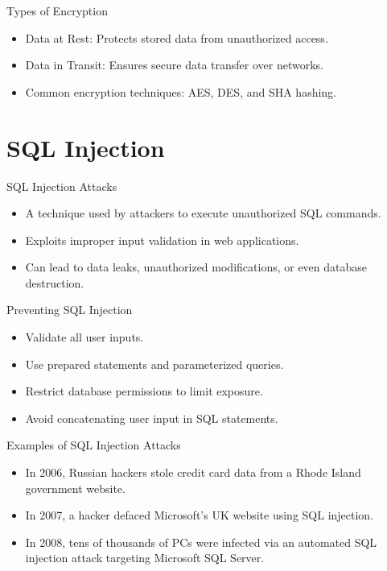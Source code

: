 \documentclass{beamer}
\begin{document}
\begin{frame}{Types of Encryption}
    \begin{itemize}
        \item Data at Rest: Protects stored data from unauthorized access.
        \item Data in Transit: Ensures secure data transfer over networks.
        \item Common encryption techniques: AES, DES, and SHA hashing.
    \end{itemize}
\end{frame}

\section{SQL Injection}

\begin{frame}{SQL Injection Attacks}
    \begin{itemize}
        \item A technique used by attackers to execute unauthorized SQL commands.
        \item Exploits improper input validation in web applications.
        \item Can lead to data leaks, unauthorized modifications, or even database destruction.
    \end{itemize}
\end{frame}

\begin{frame}{Preventing SQL Injection}
    \begin{itemize}
        \item Validate all user inputs.
        \item Use prepared statements and parameterized queries.
        \item Restrict database permissions to limit exposure.
        \item Avoid concatenating user input in SQL statements.
    \end{itemize}
\end{frame}

\begin{frame}{Examples of SQL Injection Attacks}
    \begin{itemize}
        \item In 2006, Russian hackers stole credit card data from a Rhode Island government website.
        \item In 2007, a hacker defaced Microsoft's UK website using SQL injection.
        \item In 2008, tens of thousands of PCs were infected via an automated SQL injection attack targeting Microsoft SQL Server.
    \end{itemize}
\end{frame}
\end{document}
